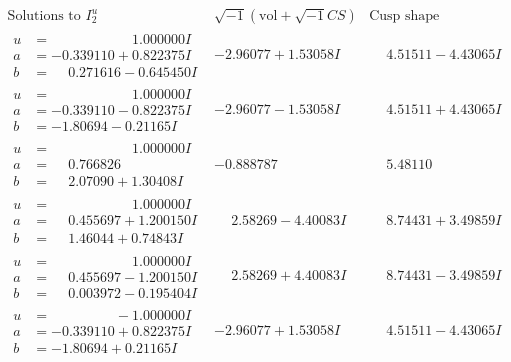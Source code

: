 \documentclass[1p]{elsarticle_modified}
\theoremstyle{definition}
\newcommand{\I}{\sqrt{-1}}
\begin{document}
$$\begin{array}{c|c|c}  
\text{Solutions to }I^u_{2}& \I (\text{vol} + \sqrt{-1}CS) & \text{Cusp shape}\\
 \hline 
\begin{aligned}
u &= \phantom{-0.000000 -}1.000000 I \\
a &= -0.339110 + 0.822375 I \\
b &= \phantom{-}0.271616 - 0.645450 I\end{aligned}
 & -2.96077 + 1.53058 I & \phantom{-}4.51511 - 4.43065 I \\ \hline\begin{aligned}
u &= \phantom{-0.000000 -}1.000000 I \\
a &= -0.339110 - 0.822375 I \\
b &= -1.80694 - 0.21165 I\end{aligned}
 & -2.96077 - 1.53058 I & \phantom{-}4.51511 + 4.43065 I \\ \hline\begin{aligned}
u &= \phantom{-0.000000 -}1.000000 I \\
a &= \phantom{-}0.766826\phantom{ +0.000000I} \\
b &= \phantom{-}2.07090 + 1.30408 I\end{aligned}
 & -0.888787\phantom{ +0.000000I} & \phantom{-}5.48110\phantom{ +0.000000I} \\ \hline\begin{aligned}
u &= \phantom{-0.000000 -}1.000000 I \\
a &= \phantom{-}0.455697 + 1.200150 I \\
b &= \phantom{-}1.46044 + 0.74843 I\end{aligned}
 & \phantom{-}2.58269 - 4.40083 I & \phantom{-}8.74431 + 3.49859 I \\ \hline\begin{aligned}
u &= \phantom{-0.000000 -}1.000000 I \\
a &= \phantom{-}0.455697 - 1.200150 I \\
b &= \phantom{-}0.003972 - 0.195404 I\end{aligned}
 & \phantom{-}2.58269 + 4.40083 I & \phantom{-}8.74431 - 3.49859 I \\ \hline\begin{aligned}
u &= \phantom{-0.000000 } -1.000000 I \\
a &= -0.339110 + 0.822375 I \\
b &= -1.80694 + 0.21165 I\end{aligned}
 & -2.96077 + 1.53058 I & \phantom{-}4.51511 - 4.43065 I \\ \hline\begin{aligned}

\end{aligned}
\end{array}$$
\end{document}
